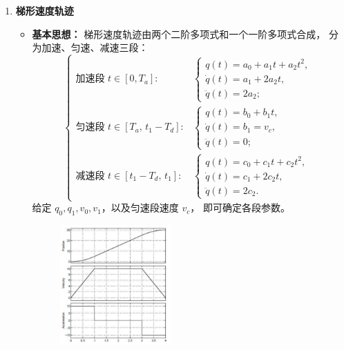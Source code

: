 \documentclass[../main.tex]{subfiles}
\begin{document}
\begin{enumerate}
\begin{enumerate}
\begin{figure}[htbp]
\begin{subfigure}{0.32\textwidth}
                    \caption{初末速度不等，非对称时间、非对称轨迹}
                    \label{fig:pwx3}
                \end{subfigure}
            \end{figure}
            \item \textbf{梯形速度轨迹}\label{method:trapezoid}
            {\small\kaishu
            \begin{itemize}
                \item \textbf{基本思想：}  
                梯形速度轨迹由两个二阶多项式和一个一阶多项式合成，
                分为加速、匀速、减速三段：
                \[
                \begin{cases}
                \text{加速段 } t\in[0,T_a]: &
                \begin{cases}
                q(t)=a_0+a_1t+a_2t^2,\\
                \dot q(t)=a_1+2a_2t,\\
                \ddot q(t)=2a_2;
                \end{cases}\\[6pt]
                \text{匀速段 } t\in[T_a,\,t_1-T_d]: &
                \begin{cases}
                q(t)=b_0+b_1t,\\
                \dot q(t)=b_1=v_c,\\
                \ddot q(t)=0;
                \end{cases}\\[6pt]
                \text{减速段 } t\in[t_1-T_d,\,t_1]: &
                \begin{cases}
                q(t)=c_0+c_1t+c_2t^2,\\
                \dot q(t)=c_1+2c_2t,\\
                \ddot q(t)=2c_2.
                \end{cases}
                \end{cases}
                \]
                给定 $q_0,q_1,v_0,v_1$，以及匀速段速度 $v_c$，
                即可确定各段参数。
                \begin{figure}[H]
                    \centering
                    \includegraphics[width=0.43\textwidth]{images/tx.png}

\end{figure}
\end{itemize}}
\end{enumerate}
\end{enumerate}
\end{document}

